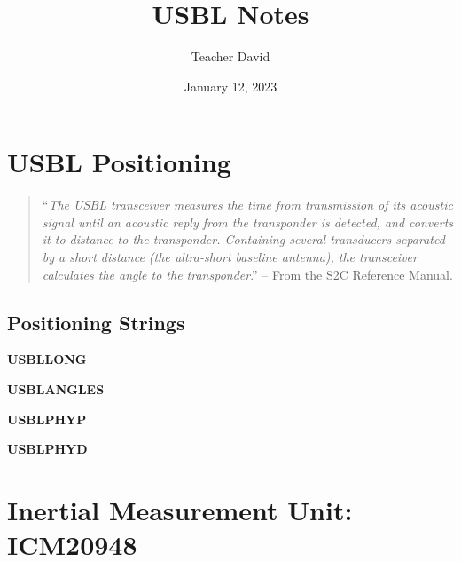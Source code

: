 \documentclass[11pt, oneside]{article}   	%
\title{USBL Notes}
\author{Teacher David}
\date{January 12, 2023}							%
\begin{document}
\maketitle

\section{USBL Positioning}
\begin{quotation}
``\emph{The USBL transceiver measures the time from transmission of its acoustic signal until an acoustic reply from the transponder is detected, and converts it to distance to the transponder. Containing several transducers separated by a short distance (the ultra-short baseline antenna), the transceiver calculates the angle to the transponder}.'' -- From the S2C Reference Manual.
\end{quotation}

\subsection{Positioning Strings}

\textbf{USBLLONG}

\textbf{USBLANGLES}


\textbf{USBLPHYP}

\textbf{USBLPHYD}


\newpage
\section{Inertial Measurement Unit: ICM20948}
\end{document}
